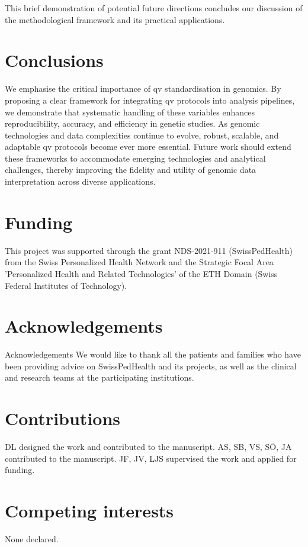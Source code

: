 This brief demonstration of potential future directions concludes our discussion of the methodological framework and its practical applications.

\section{Conclusions}
We emphasise the critical importance of \ac{qv} standardisation in genomics. By proposing a clear framework for integrating \ac{qv} protocols into analysis pipelines, we demonstrate that systematic handling of these variables enhances reproducibility, accuracy, and efficiency in genetic studies. As genomic technologies and data complexities continue to evolve, robust, scalable, and adaptable \ac{qv} protocols become ever more essential. Future work should extend these frameworks to accommodate emerging technologies and analytical challenges, thereby improving the fidelity and utility of genomic data interpretation across diverse applications.

\section{Funding}
This project was supported through the grant NDS-2021-911 (SwissPedHealth) from the Swiss Personalized Health Network and the Strategic Focal Area 'Personalized Health and Related Technologies' of the ETH Domain (Swiss Federal Institutes of Technology).

\section{Acknowledgements}
Acknowledgements We would like to thank all the patients and families who have been providing advice on SwissPedHealth and its projects, as well as the clinical and research teams at the participating institutions.

\section{Contributions}
DL designed the work and contributed to the manuscript.
AS, SB, VS, SÖ, JA contributed to the manuscript.
JF, JV, LJS supervised the work and applied for funding.

\section{Competing interests}
None declared.

